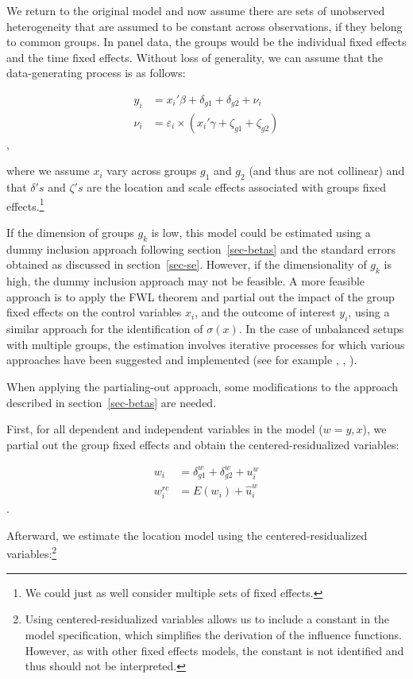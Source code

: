 \documentclass[
  authoryear,
  review,
  1p]{elsarticle}
\begin{document}
We return to the original model and now assume there are sets of unobserved
heterogeneity that are assumed to be constant across observations, if
they belong to common groups. In panel data, the groups would be the
individual fixed effects and the time fixed effects. Without loss of
generality, we can assume that the data-generating process is as
follows:

\[\begin{aligned}
  y_{i} &= x_{i}' \beta + \delta_{g1} + \delta_{g2} + \nu_i \\
  \nu_i &= \varepsilon_i \times (x_{i}' \gamma + \zeta_{g1} + \zeta_{g2})   
  \end{aligned}
\],

where we assume \(x_{i}\) vary across groups \(g_1\) and \(g_2\) (and thus
are not collinear) and that \(\delta's\) and \(\zeta's\) are the
location and scale effects associated with groups fixed
effects.\footnote{We could just as well consider multiple sets of fixed
  effects.}

If the dimension of groups \(g_k\) is low, this model could be estimated
using a dummy inclusion approach following section~\ref{sec-betas} and
the standard errors obtained as discussed in section~\ref{sec-se}. However,
if the dimensionality of \(g_k\) is high, the dummy inclusion approach
may not be feasible. A more feasible approach is to apply the
FWL theorem and partial out the impact of the
group fixed effects on the control variables \(x_{i}\), and the outcome of
interest \(y_{i}\), using a similar approach for the identification of
\(\sigma(x)\). In the case of unbalanced setups with multiple groups,
the estimation involves iterative processes for which various approaches
have been suggested and implemented (see for example
\citet{correia_feasible_nodate}, \citet{gaure2013}, \citet{rios2015}
).

When applying the partialing-out approach, some modifications to the
approach described in section~\ref{sec-betas} are needed.

First, for all dependent and independent variables in the model
(\(w=y,x\)), we partial out the group fixed effects and obtain the
centered-residualized variables:

\[\begin{aligned}
w_{i} &= \delta_{g1}^w + \delta_{g2}^w + u_{i}^w \\
w_{i}^{rc} &= E(w_{i}) + \hat{u}_{i}^w
\end{aligned}
\].

Afterward, we estimate the location model using the
centered-residualized variables:\footnote{Using centered-residualized
  variables allows us to include a constant in the model specification,
  which simplifies the derivation of the influence functions. However,
  as with other fixed effects models, the constant is not identified
  and thus should not be interpreted.}
\end{document}
